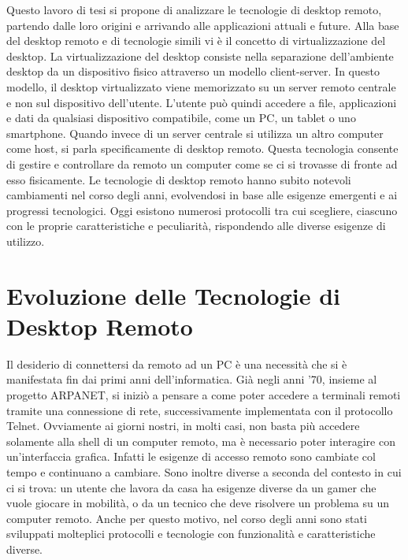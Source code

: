 \documentclass[12pt,a4paper,openright,twoside]{book}
\begin{document}
Questo lavoro di tesi si propone di analizzare le tecnologie di desktop remoto,
partendo dalle loro origini e arrivando alle applicazioni attuali e future.
%
Alla base del desktop remoto e di tecnologie simili vi è il concetto di virtualizzazione del desktop.
La virtualizzazione del desktop consiste nella separazione dell'ambiente desktop da un dispositivo fisico attraverso un modello client-server.
In questo modello, il desktop virtualizzato viene memorizzato su un server remoto centrale e non sul dispositivo dell'utente.
L'utente può quindi accedere a file,
applicazioni e dati da qualsiasi dispositivo compatibile,
come un \ac{PC},
un tablet o uno smartphone. %
Quando invece di un server centrale si utilizza un altro computer come host,
si parla specificamente di desktop remoto.
Questa tecnologia consente di gestire e controllare da remoto un computer come se ci si trovasse di fronte ad esso fisicamente.
%
Le tecnologie di desktop remoto hanno subito notevoli cambiamenti nel corso degli anni,
evolvendosi in base alle esigenze emergenti e ai progressi tecnologici.
%
Oggi esistono numerosi protocolli tra cui scegliere,
ciascuno con le proprie caratteristiche e peculiarità,
rispondendo alle diverse esigenze di utilizzo.



\chapter{Evoluzione delle Tecnologie di Desktop Remoto}
\label{chap:evolution}
Il desiderio di connettersi da remoto ad un \ac{PC} è una necessità che si è manifestata fin dai primi anni dell'informatica.
Già negli anni '70,
insieme al progetto ARPANET, si iniziò a pensare a come poter accedere a terminali remoti tramite una connessione di rete,
successivamente implementata con il protocollo Telnet.
Ovviamente ai giorni nostri, in molti casi, non basta più accedere solamente alla shell di un computer remoto,
ma è necessario poter interagire con un'interfaccia grafica.
%
Infatti le esigenze di accesso remoto sono cambiate col tempo e continuano a cambiare.
Sono inoltre diverse a seconda del contesto in cui ci si trova:
un utente che lavora da casa ha esigenze diverse da un gamer che vuole giocare in mobilità,
o da un tecnico che deve risolvere un problema su un computer remoto.
Anche per questo motivo, nel corso degli anni sono stati sviluppati molteplici protocolli e tecnologie con funzionalità e caratteristiche diverse.
\end{document}
